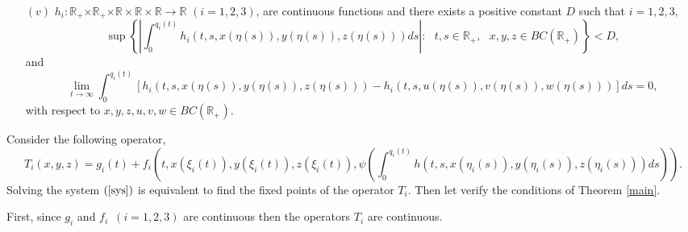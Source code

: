 \documentclass{amsart}
\theoremstyle{plain}
\numberwithin{equation}{section}
\begin{document}
\begin{enumerate}
\item[$\left( v\right) $] $h_{i}:\mathbb{R}_{+}\mathbb{\times R}_{+}\mathbb{\times R\times R\times R\rightarrow R}$ $\left( i=1,2,3\right) $, are
continuous functions and there exists a positive constant $D$ such that $i=1,2,3,$\begin{equation}
\sup \left\{ \left\vert \int_{0}^{q_{i}\left( t\right) }h_{i}\left(
t,s,x\left( \eta \left( s\right) \right) ,y\left( \eta \left( s\right)
\right) ,z\left( \eta \left( s\right) \right) \right) ds\right\vert :\text{ }t,s\in \mathbb{R}_{+},\text{ }x,y,z\in BC\left( \mathbb{R}_{+}\right)
\right\} <D,  \label{D}
\end{equation}and\begin{equation}
\lim_{t\rightarrow \infty }\int_{0}^{q_{i}\left( t\right) }\left[
h_{i}\left( t,s,x\left( \eta \left( s\right) \right) ,y\left( \eta \left(
s\right) \right) ,z\left( \eta \left( s\right) \right) \right) -h_{i}\left(
t,s,u\left( \eta \left( s\right) \right) ,v\left( \eta \left( s\right)
\right) ,w\left( \eta \left( s\right) \right) \right) \right] ds=0,
\label{limh}
\end{equation}with respect to $x,y,z,u,v,w\in BC\left( \mathbb{R}_{+}\right) .$
\end{enumerate}

Consider the following operator, 
\begin{equation*}
T_{i}\left( x,y,z\right) =g_{i}\left( t\right) +f_{i}\left( t,x\left( \xi
_{i}\left( t\right) \right) ,y\left( \xi _{i}\left( t\right) \right)
,z\left( \xi _{i}\left( t\right) \right) ,\psi \left( \int_{0}^{q_{i}\left(
t\right) }h\left( t,s,x\left( \eta _{i}\left( s\right) \right) ,y\left( \eta
_{i}\left( s\right) \right) ,z\left( \eta _{i}\left( s\right) \right)
\right) ds\right) \right) .
\end{equation*}Solving the system $\left( \text{\ref{sys}}\right) $ is equivalent to find
the fixed points of the operator $T_{i}$. Then let verify the conditions of
Theorem \ref{main}$.$

First, since $g_{i}$ and $f_{i}$\ $\left( i=1,2,3\right) $ are continuous
then the operators $T_{i}$ are continuous.
\end{document}
